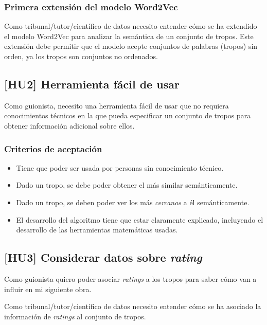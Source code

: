 \subsubsection{Primera extensión del modelo Word2Vec}\label{uc:word2vec_primera_extension}

Como tribunal/tutor/científico de datos
necesito entender cómo se ha extendido el modelo Word2Vec para analizar la semántica de un conjunto de
tropos. Este extensión debe permitir que el modelo acepte conjuntos de palabras (tropos) sin orden, ya
los tropos son conjuntos no ordenados.

\subsection{[HU2] Herramienta fácil de usar}\label{uc:herramienta_guionistas}

Como guionista, necesito una herramienta
fácil de usar que no requiera conocimientos técnicos en la que pueda especificar un conjunto de tropos para obtener
información adicional sobre ellos.

\subsubsection{Criterios de aceptación}

\begin{itemize}
      \item Tiene que poder ser usada por personas sin conocimiento técnico.
      \item Dado un tropo, se debe poder obtener el más similar semánticamente.
      \item Dado un tropo, se deben poder ver los más \textit{cercanos} a él semánticamente.
      \item El desarrollo del algoritmo tiene que estar claramente explicado, incluyendo el desarrollo de las herramientas matemáticas usadas.
\end{itemize}

\subsection{[HU3] Considerar datos sobre \textit{rating}}\label{uc:word2vec_rating}

Como guionista quiero poder asociar \textit{ratings} a los tropos para saber cómo van
a influir en mi siguiente obra.

Como tribunal/tutor/científico de datos necesito entender cómo se ha asociado la información
de \textit{ratings} al conjunto de tropos.

